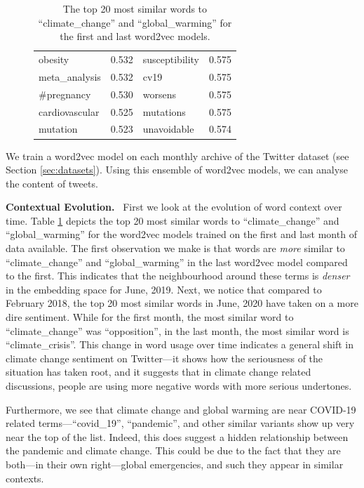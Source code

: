 \documentclass{paper}
\newcommand{\inlineSection}[1]{\vspace{0.5em}\noindent\textbf{#1.}~}
\begin{document}
\begin{table}[ht]
\begin{subfigure}{0.49\textwidth}
\begin{tabularx}{\textwidth}{@{}XXXX@{}}
            obesity & 0.532 & susceptibility & 0.575\\\hdashline
            meta\_analysis & 0.532 & cv19 & 0.575\\\hdashline
            \#pregnancy & 0.530 & worsens & 0.575\\\hdashline
            cardiovascular & 0.525 & mutations & 0.575\\\hdashline
            mutation & 0.523 & unavoidable & 0.574\\\bottomrule
        \end{tabularx}
    \end{subfigure}
    \caption{The top 20 most similar words to ``climate\_change'' and ``global\_warming'' for the first and last word2vec models.}
    \label{tab:most_similar_words}
\end{table}


We train a word2vec model on each monthly archive of the Twitter dataset (see Section \ref{sec:datasets}). Using this ensemble of word2vec models, we can analyse the content of tweets.

\inlineSection{Contextual Evolution} First we look at the evolution of word context over time. Table \ref{tab:most_similar_words} depicts the top 20 most similar words to ``climate\_change'' and ``global\_warming'' for the word2vec models trained on the first and last month of data available. The first observation we make is that words are \textit{more} similar to ``climate\_change'' and ``global\_warming'' in the last word2vec model compared to the first. This indicates that the neighbourhood around these terms is \textit{denser} in the embedding space for June, 2019. Next, we notice that compared to February 2018, the top 20 most similar words in June, 2020 have taken on a more dire sentiment. While for the first month, the most similar word to ``climate\_change'' was ``opposition'', in the last month, the most similar word is ``climate\_crisis''. This change in word usage over time indicates a general shift in climate change sentiment on Twitter---it shows how the seriousness of the situation has taken root, and it suggests that in climate change related discussions, people are using more negative words with more serious undertones.

Furthermore, we see that climate change and global warming are near COVID-19 related terms---``covid\_19'', ``pandemic'', and other similar variants show up very near the top of the list. Indeed, this does suggest a hidden relationship between the pandemic and climate change. This could be due to the fact that they are both---in their own right---global emergencies, and such they appear in similar contexts.
\end{document}
